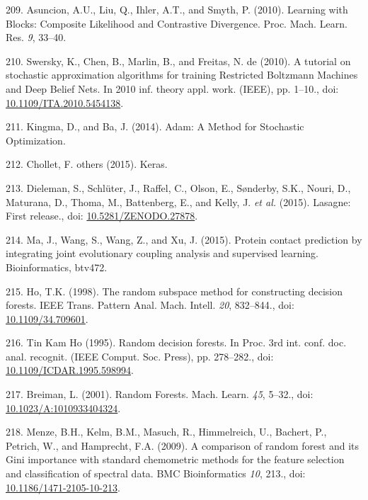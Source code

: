 \documentclass[11pt,a4paper,twoside]{book}
\theoremstyle{definition}
\theoremstyle{definition}
\theoremstyle{remark}
\begin{document}
\hypertarget{ref-Asuncion2010}{}
209. Asuncion, A.U., Liu, Q., Ihler, A.T., and Smyth, P. (2010).
Learning with Blocks: Composite Likelihood and Contrastive Divergence.
Proc. Mach. Learn. Res. \emph{9}, 33--40.

\hypertarget{ref-Swersky2010}{}
210. Swersky, K., Chen, B., Marlin, B., and Freitas, N. de (2010). A
tutorial on stochastic approximation algorithms for training Restricted
Boltzmann Machines and Deep Belief Nets. In 2010 inf. theory appl. work.
(IEEE), pp. 1--10., doi:
\href{https://doi.org/10.1109/ITA.2010.5454138}{10.1109/ITA.2010.5454138}.

\hypertarget{ref-Kingma2014}{}
211. Kingma, D., and Ba, J. (2014). Adam: A Method for Stochastic
Optimization.

\hypertarget{ref-Chollet2015}{}
212. Chollet, F. others (2015). Keras.

\hypertarget{ref-Dieleman2015}{}
213. Dieleman, S., Schlüter, J., Raffel, C., Olson, E., Sønderby, S.K.,
Nouri, D., Maturana, D., Thoma, M., Battenberg, E., and Kelly, J.
\emph{et al.} (2015). Lasagne: First release., doi:
\href{https://doi.org/10.5281/ZENODO.27878}{10.5281/ZENODO.27878}.

\hypertarget{ref-Ma2015a}{}
214. Ma, J., Wang, S., Wang, Z., and Xu, J. (2015). Protein contact
prediction by integrating joint evolutionary coupling analysis and
supervised learning. Bioinformatics, btv472.

\hypertarget{ref-Ho1998}{}
215. Ho, T.K. (1998). The random subspace method for constructing
decision forests. IEEE Trans. Pattern Anal. Mach. Intell. \emph{20},
832--844., doi:
\href{https://doi.org/10.1109/34.709601}{10.1109/34.709601}.

\hypertarget{ref-TinKamHo}{}
216. Tin Kam Ho (1995). Random decision forests. In Proc. 3rd int. conf.
doc. anal. recognit. (IEEE Comput. Soc. Press), pp. 278--282., doi:
\href{https://doi.org/10.1109/ICDAR.1995.598994}{10.1109/ICDAR.1995.598994}.

\hypertarget{ref-Breiman2001}{}
217. Breiman, L. (2001). Random Forests. Mach. Learn. \emph{45}, 5--32.,
doi:
\href{https://doi.org/10.1023/A:1010933404324}{10.1023/A:1010933404324}.

\hypertarget{ref-Menze2009}{}
218. Menze, B.H., Kelm, B.M., Masuch, R., Himmelreich, U., Bachert, P.,
Petrich, W., and Hamprecht, F.A. (2009). A comparison of random forest
and its Gini importance with standard chemometric methods for the
feature selection and classification of spectral data. BMC
Bioinformatics \emph{10}, 213., doi:
\href{https://doi.org/10.1186/1471-2105-10-213}{10.1186/1471-2105-10-213}.
\end{document}
